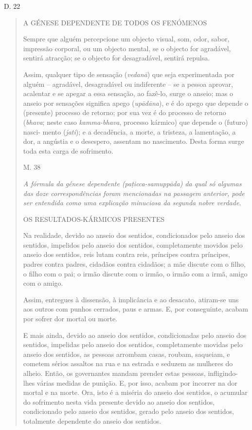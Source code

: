D. 22

\begin{quote}
A GÉNESE DEPENDENTE DE TODOS OS FENÓMENOS

Sempre que alguém percepcione um objecto visual, som, odor, sabor, impressão corporal, ou um objecto mental, se o objecto for agradável, sentirá atracção; se o objecto for desagradável, sentirá repulsa.

Assim, qualquer tipo de sensação (\emph{vedanā}) que seja experimentada por alguém -- agradável, desagradável ou indiferente -- se a pessoa aprovar, acalentar e se apegar a essa sensação, ao fazê-lo, surge o anseio; mas o anseio por sensações significa apego (\emph{upādāna}), e é do apego que depende o (presente) processo de retorno; por sua vez é do processo de retorno (\emph{bhava}; neste caso \emph{kamma-bhava}, processo kármico) que depende o (futuro) nasci- mento (\emph{jati}); e a decadência, a morte, a tristeza, a lamentação, a dor, a angústia e o desespero, assentam no nascimento. Desta forma surge toda esta carga de sofrimento.

M. 38

\emph{A fórmula da génese dependente (paṭicca-samuppāda) da qual só algumas das doze correspondências foram mencionadas na passagem anterior, pode ser entendida como uma explicação minuciosa da segunda nobre verdade.}

OS RESULTADOS-KÁRMICOS PRESENTES

Na realidade, devido ao anseio dos sentidos, condicionados pelo anseio dos sentidos, impelidos pelo anseio dos sentidos, completamente movidos pelo anseio dos sentidos, reis lutam contra reis, príncipes contra príncipes, padres contra padres, cidadãos contra cidadãos; a mãe discute com o filho, o filho com o pai; o irmão discute com o irmão, o irmão com a irmã, amigo com o amigo.

Assim, entregues à dissensão, à implicância e ao desacato, atiram-se uns aos outros com punhos cerrados, paus e armas. E, por conseguinte, acabam por sofrer dor mortal ou morte.

E mais ainda, devido ao anseio dos sentidos, condicionadas pelo anseio dos sentidos, impelidas pelo anseio dos sentidos, completamente movidas pelo anseio dos sentidos, as pessoas arrombam casas, roubam, saqueiam, e cometem sérios assaltos na rua e na estrada e seduzem as mulheres do alheio. Então, os governantes mandam prender estas pessoas, infligindo-lhes várias medidas de punição. E, por isso, acabam por incorrer na dor mortal e na morte. Ora, isto é a miséria do anseio dos sentidos, o acumular do sofrimento nesta vida presente devido ao anseio dos sentidos, condicionado pelo anseio dos sentidos, gerado pelo anseio dos sentidos, totalmente dependente do anseio dos sentidos.


\end{quote}
